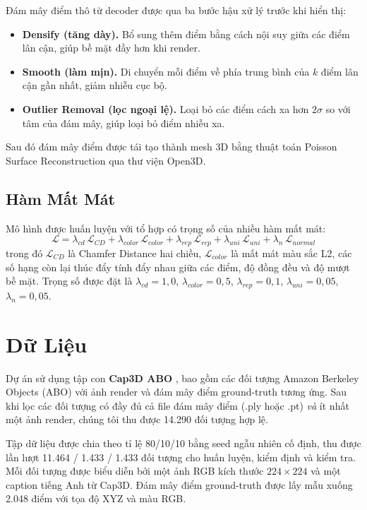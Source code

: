 \documentclass[conference]{IEEEtran}
\begin{document}
Đám mây điểm thô từ decoder được qua ba bước hậu xử lý trước khi hiển thị:
\begin{itemize}
    \item \textbf{Densify (tăng dày).} Bổ sung thêm điểm bằng cách nội suy giữa các điểm lân cận, giúp bề mặt đầy hơn khi render.
    \item \textbf{Smooth (làm mịn).} Di chuyển mỗi điểm về phía trung bình của $k$ điểm lân cận gần nhất, giảm nhiễu cục bộ.
    \item \textbf{Outlier Removal (lọc ngoại lệ).} Loại bỏ các điểm cách xa hơn $2\sigma$ so với tâm của đám mây, giúp loại bỏ điểm nhiễu xa.
\end{itemize}
Sau đó đám mây điểm được tái tạo thành mesh 3D bằng thuật toán Poisson Surface Reconstruction qua thư viện Open3D.

\subsection{Hàm Mất Mát}

Mô hình được huấn luyện với tổ hợp có trọng số của nhiều hàm mất mát:
\begin{equation}
    \mathcal{L} = \lambda_{cd}\,\mathcal{L}_{CD} + \lambda_{color}\,\mathcal{L}_{color} + \lambda_{rep}\,\mathcal{L}_{rep} + \lambda_{uni}\,\mathcal{L}_{uni} + \lambda_{n}\,\mathcal{L}_{normal}
\end{equation}
trong đó $\mathcal{L}_{CD}$ là Chamfer Distance hai chiều, $\mathcal{L}_{color}$ là mất mát màu sắc L2, các số hạng còn lại thúc đẩy tính đẩy nhau giữa các điểm, độ đồng đều và độ mượt bề mặt. Trọng số được đặt là $\lambda_{cd}{=}1{,}0$, $\lambda_{color}{=}0{,}5$, $\lambda_{rep}{=}0{,}1$, $\lambda_{uni}{=}0{,}05$, $\lambda_{n}{=}0{,}05$.

\section{Dữ Liệu}

Dự án sử dụng tập con \textbf{Cap3D ABO} \cite{cap3d}, bao gồm các đối tượng Amazon Berkeley Objects (ABO) với ảnh render và đám mây điểm ground-truth tương ứng. Sau khi lọc các đối tượng có đầy đủ cả file đám mây điểm (.ply hoặc .pt) \emph{và} ít nhất một ảnh render, chúng tôi thu được 14.290 đối tượng hợp lệ.

Tập dữ liệu được chia theo tỉ lệ 80/10/10 bằng seed ngẫu nhiên cố định, thu được lần lượt 11.464 / 1.433 / 1.433 đối tượng cho huấn luyện, kiểm định và kiểm tra. Mỗi đối tượng được biểu diễn bởi một ảnh RGB kích thước $224{\times}224$ và một caption tiếng Anh từ Cap3D. Đám mây điểm ground-truth được lấy mẫu xuống 2.048 điểm với tọa độ XYZ và màu RGB.
\end{document}
